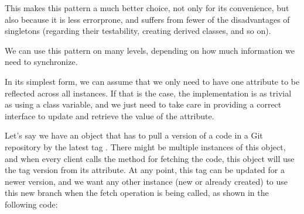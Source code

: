 \documentclass[a4paper,10pt,english]{sphinxmanual}
\begin{document}
This makes this pattern a much better choice, not only for its convenience, but also because
it is less error\sphinxhyphen{}prone, and suffers from fewer of the disadvantages of singletons (regarding
their testability, creating derived classes, and so on).

We can use this pattern on many levels, depending on how much information we need to
synchronize.

In its simplest form, we can assume that we only need to have one attribute to be reflected
across all instances. If that is the case, the implementation is as trivial as using a class
variable, and we just need to take care in providing a correct interface to update and
retrieve the value of the attribute.

Let’s say we have an object that has to pull a version of a code in a Git repository by the
latest tag . There might be multiple instances of this object, and when every client calls the
method for fetching the code, this object will use the tag version from its attribute. At any
point, this tag can be updated for a newer version, and we want any other instance (new or
already created) to use this new branch when the fetch operation is being called, as shown
in the following code:

\begin{sphinxVerbatim}[commandchars=\\\{\}]
 
      

  
      

 
       
         
     

  
      

 
     
     
\end{sphinxVerbatim}
\end{document}
